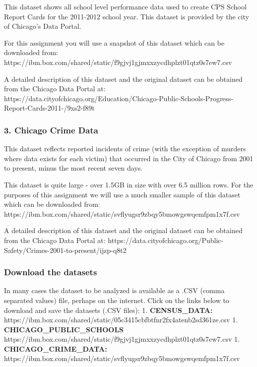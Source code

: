 \documentclass[11pt]{article}
\begin{document}
This dataset shows all school level performance data used to create CPS
School Report Cards for the 2011-2012 school year. This dataset is
provided by the city of Chicago's Data Portal.

For this assignment you will use a snapshot of this dataset which can be
downloaded from:
https://ibm.box.com/shared/static/f9gjvj1gjmxxzycdhplzt01qtz0s7ew7.csv

A detailed description of this dataset and the original dataset can be
obtained from the Chicago Data Portal at:
https://data.cityofchicago.org/Education/Chicago-Public-Schools-Progress-Report-Cards-2011-/9xs2-f89t

\hypertarget{chicago-crime-data}{%
\subsubsection{3. Chicago Crime Data}\label{chicago-crime-data}}

This dataset reflects reported incidents of crime (with the exception of
murders where data exists for each victim) that occurred in the City of
Chicago from 2001 to present, minus the most recent seven days.

This dataset is quite large - over 1.5GB in size with over 6.5 million
rows. For the purposes of this assignment we will use a much smaller
sample of this dataset which can be downloaded from:
https://ibm.box.com/shared/static/svflyugsr9zbqy5bmowgswqemfpm1x7f.csv

A detailed description of this dataset and the original dataset can be
obtained from the Chicago Data Portal at:
https://data.cityofchicago.org/Public-Safety/Crimes-2001-to-present/ijzp-q8t2

    \hypertarget{download-the-datasets}{%
\subsubsection{Download the datasets}\label{download-the-datasets}}

In many cases the dataset to be analyzed is available as a .CSV (comma
separated values) file, perhaps on the internet. Click on the links
below to download and save the datasets (.CSV files): 1.
\textbf{CENSUS\_DATA:}
https://ibm.box.com/shared/static/05c3415cbfbtfnr2fx4atenb2sd361ze.csv
1. \textbf{CHICAGO\_PUBLIC\_SCHOOLS}
https://ibm.box.com/shared/static/f9gjvj1gjmxxzycdhplzt01qtz0s7ew7.csv
1. \textbf{CHICAGO\_CRIME\_DATA:}
https://ibm.box.com/shared/static/svflyugsr9zbqy5bmowgswqemfpm1x7f.csv
\end{document}
